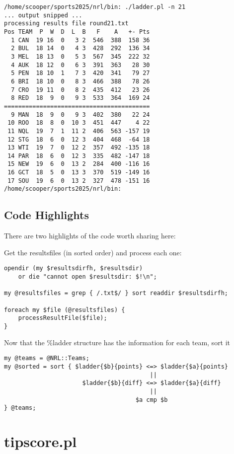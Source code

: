 \documentclass{article}      %
\begin{document}
\begin{verbatim}
/home/scooper/sports2025/nrl/bin: ./ladder.pl -n 21
... output snipped ...
processing results file round21.txt
Pos TEAM  P  W  D  L  B   F    A   +- Pts
  1 CAN  19 16  0   3 2  546  388  158 36
  2 BUL  18 14  0   4 3  428  292  136 34
  3 MEL  18 13  0   5 3  567  345  222 32
  4 AUK  18 12  0   6 3  391  363   28 30
  5 PEN  18 10  1   7 3  420  341   79 27
  6 BRI  18 10  0   8 3  466  388   78 26
  7 CRO  19 11  0   8 2  435  412   23 26
  8 RED  18  9  0   9 3  533  364  169 24
=========================================
  9 MAN  18  9  0   9 3  402  380   22 24
 10 ROO  18  8  0  10 3  451  447    4 22
 11 NQL  19  7  1  11 2  406  563 -157 19
 12 STG  18  6  0  12 3  404  468  -64 18
 13 WTI  19  7  0  12 2  357  492 -135 18
 14 PAR  18  6  0  12 3  335  482 -147 18
 15 NEW  19  6  0  13 2  284  400 -116 16
 16 GCT  18  5  0  13 3  370  519 -149 16
 17 SOU  19  6  0  13 2  327  478 -151 16
/home/scooper/sports2025/nrl/bin:
\end{verbatim}

\subsection{Code Highlights}

There are two highlights of the code worth sharing here:

Get the resultsfiles (in sorted order) and process each one:
\begin{verbatim}
opendir (my $resultsdirfh, $resultsdir)
    or die "cannot open $resultsdir: $!\n";

my @resultsfiles = grep { /.txt$/ } sort readdir $resultsdirfh;

foreach my $file (@resultsfiles) {
    processResultFile($file);
}

\end{verbatim}

Now that the \%ladder structure has the information for each team,
sort it

\begin{verbatim}
my @teams = @NRL::Teams;
my @sorted = sort { $ladder{$b}{points} <=> $ladder{$a}{points}
                                         ||
                      $ladder{$b}{diff} <=> $ladder{$a}{diff}
                                         ||
                                     $a cmp $b
} @teams;
\end{verbatim}

\section{tipscore.pl}
\end{document}
